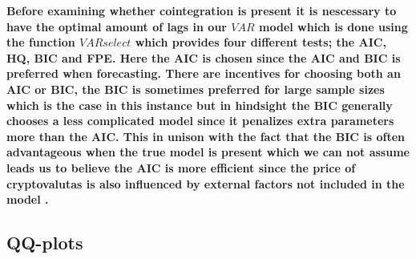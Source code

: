 \textbf{Before examining whether cointegration is present it is nescessary to have the optimal amount of lags in our $VAR$ model which is done using the function $VARselect$ which provides four different tests; the AIC, HQ, BIC and FPE. Here the AIC is chosen since the AIC and BIC is preferred when forecasting. There are incentives for choosing both an AIC or BIC, the BIC is sometimes preferred for large sample sizes which is the case in this instance but in hindsight the BIC generally chooses a less complicated model since it penalizes extra parameters more than the AIC. This in unison with the fact that the BIC is often advantageous when the true model is present which we can not assume leads us to believe the AIC is more efficient since the price of cryptovalutas is also influenced by external factors not included in the model \cite{AICorBIC}.}




\newpage
\subsection{QQ-plots}

